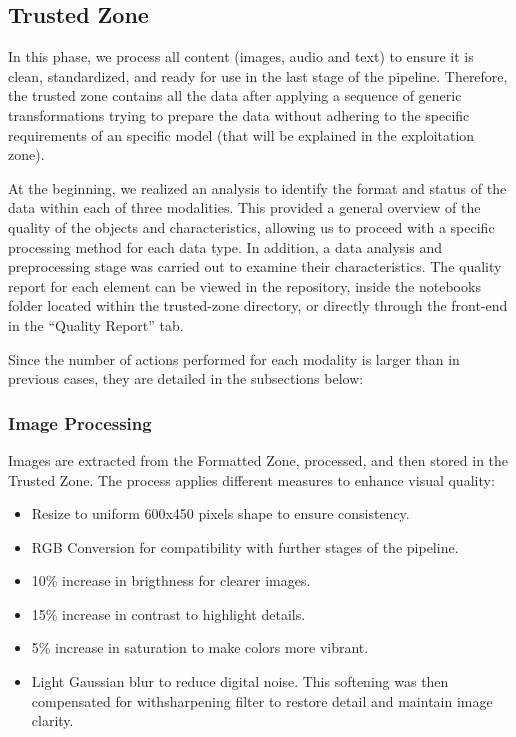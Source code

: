 \documentclass[12pt]{article}
\begin{document}
\subsection{Trusted Zone}
In this phase, we process all content (images, audio and text) to ensure it is clean, standardized, and ready for use in the last stage of the pipeline. Therefore, the trusted zone contains all the data after applying a sequence of generic transformations trying to prepare the data without adhering to the specific requirements of an specific model (that will be explained in the exploitation zone). 

At the beginning, we realized an analysis to identify the format and status of the data within each of three modalities. This provided a general overview of the quality of the objects and characteristics, allowing us to proceed with a specific processing method for each data type. In addition, a data analysis and preprocessing stage was carried out to examine their characteristics.
The quality report for each element can be viewed in the repository, inside the notebooks folder located within the trusted-zone directory, or directly through the front-end in the “Quality Report” tab.

Since the number of actions performed for each modality is larger than in previous cases, they are detailed in the subsections below:

\subsubsection{Image Processing}
Images are extracted from the Formatted Zone, processed, and then stored in the Trusted Zone. The process applies different measures to enhance visual quality:
\begin{itemize}
    \item Resize to uniform 600x450 pixels shape to ensure consistency.
    \item RGB Conversion for compatibility with further stages of the pipeline.
    \item 10\% increase in brigthness for clearer images.
    \item 15\% increase in contrast to highlight details.
    \item 5\% increase in saturation to make colors more vibrant.
    \item Light Gaussian blur to reduce digital noise. This softening was then compensated for withsharpening filter to restore detail and maintain image clarity.
\end{itemize}
\end{document}
